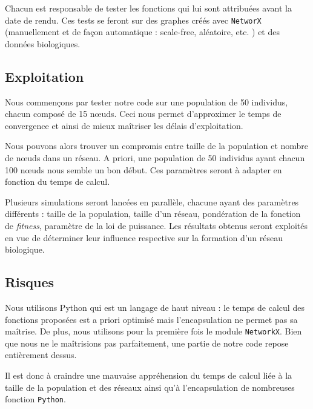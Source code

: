 Chacun est responsable de tester les fonctions qui lui sont attribuées avant la date de rendu. Ces tests se feront sur des graphes créés avec \verb?NetworX? (manuellement et de façon automatique : scale-free, aléatoire, etc. ) et des données biologiques.

\subsection{Exploitation}
Nous commençons par tester notre code sur une population de 50 individus, chacun composé de 15 nœuds. Ceci nous permet d'approximer le temps de convergence et ainsi de mieux ma\^itriser les délais d'exploitation.

Nous pouvons alors trouver un compromis entre taille de la population et nombre de nœuds dans un réseau. A priori, une population de 50 individus ayant chacun 100 nœuds nous semble un bon début. Ces paramètres seront à adapter en fonction du temps de calcul.

Plusieurs simulations seront lancées en parallèle, chacune ayant des paramètres différents : taille de la population, taille d'un réseau, pondération de la fonction de \textit{fitness}, paramètre de la loi de puissance. Les résultats obtenus seront exploités en vue de déterminer leur influence respective sur la formation d'un réseau biologique.

\subsection{Risques}
Nous utilisons Python qui est un langage de haut niveau : le temps de calcul des fonctions proposées est a priori optimisé mais l'encapsulation ne permet pas sa maîtrise. De plus, nous utilisons pour la première fois le module \verb?NetworkX?. Bien que nous ne le ma\^itrisions pas parfaitement, une partie de notre code repose entièrement dessus.

Il est donc à craindre une mauvaise appréhension du temps de calcul liée à la taille de la population et des réseaux ainsi qu'à l'encapsulation de nombreuses fonction \verb?Python?.


